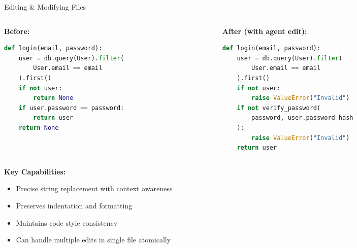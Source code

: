 \documentclass[aspectratio=169,11pt]{beamer}
\begin{document}
\begin{frame}[fragile]{Editing \& Modifying Files}
    \begin{columns}[T]
        \begin{column}{0.48\textwidth}
            \textbf{Before:}
            \begin{lstlisting}[language=python, basicstyle=\ttfamily\tiny]
def login(email, password):
    user = db.query(User).filter(
        User.email == email
    ).first()
    if not user:
        return None
    if user.password == password:
        return user
    return None
            \end{lstlisting}
        \end{column}
        \begin{column}{0.48\textwidth}
            \textbf{After (with agent edit):}
            \begin{lstlisting}[language=python, basicstyle=\ttfamily\tiny]
def login(email, password):
    user = db.query(User).filter(
        User.email == email
    ).first()
    if not user:
        raise ValueError("Invalid")
    if not verify_password(
        password, user.password_hash
    ):
        raise ValueError("Invalid")
    return user
            \end{lstlisting}
        \end{column}
    \end{columns}

    \vspace{0.3cm}
    \textbf{Key Capabilities:}
    \begin{itemize}
        \item Precise string replacement with context awareness
        \item Preserves indentation and formatting
        \item Maintains code style consistency
        \item Can handle multiple edits in single file atomically
    \end{itemize}

\end{frame}
\end{document}
